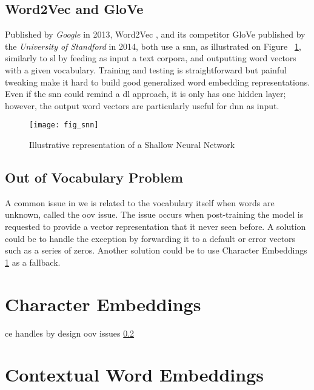 \subsection{Word2Vec and GloVe}
\label{nlp:word2vec}
Published by \textit{Google} in 2013, Word2Vec \autocite{paper:word2vec}, and its competitor GloVe \autocite{paper:glove} published by the \textit{University of Standford} in 2014, both use a \gls{snn}, as illustrated on Figure ~\ref{fig:fig_snn}, similarly to \gls{sl} by feeding as input a text corpora, and outputting word vectors with a given vocabulary. Training and testing is straightforward but painful tweaking make it hard to build good generalized word embedding representations. Even if the \gls{snn} could remind a \gls{dl} approach, it is only has one hidden layer; however, the output word vectors are particularly useful for \gls{dnn} as input.

\begin{figure}[H]
    \centering
    \texttt{[image: fig\_snn]}
    \caption{Illustrative representation of a Shallow Neural Network}
    \label{fig:fig_snn}
\end{figure}

\subsection{Out of Vocabulary Problem}
\label{nlp:oov}
A common issue in \gls{we} is related to the vocabulary itself when words are unknown, called the \gls{oov} issue. The issue occurs when post-training the model is requested to provide a vector representation that it never seen before. A solution could be to handle the exception by forwarding it to a default or error vectors such as a series of zeros. Another solution could be to use Character Embeddings \ref{nlp:ce} as a fallback.


\section{Character Embeddings}
\label{nlp:ce}
\gls{ce} handles by design \gls{oov} issues \ref{nlp:oov}


\section{Contextual Word Embeddings}

